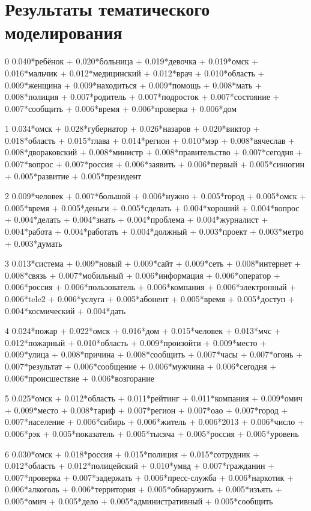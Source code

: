 \appendix
\chapter{Результаты тематического моделирования} \label{app:topics}
0 0.040*ребёнок + 0.020*больница + 0.019*девочка + 0.019*омск + 0.016*мальчик + 0.012*медицинский + 0.012*врач + 0.010*область + 0.009*женщина + 0.009*находиться + 0.009*помощь + 0.008*мать + 0.008*полиция + 0.007*родитель + 0.007*подросток + 0.007*состояние + 0.007*сообщить + 0.006*время + 0.006*проверка + 0.006*дом

1 0.034*омск + 0.028*губернатор + 0.026*назаров + 0.020*виктор + 0.018*область + 0.015*глава + 0.014*регион + 0.010*мэр + 0.008*вячеслав + 0.008*двораковский + 0.008*министр + 0.008*правительство + 0.007*сегодня + 0.007*вопрос + 0.007*россия + 0.006*заявить + 0.006*первый + 0.005*синюгин + 0.005*развитие + 0.005*президент

2 0.009*человек + 0.007*большой + 0.006*нужно + 0.005*город + 0.005*омск + 0.005*время + 0.005*деньги + 0.005*сделать + 0.004*хороший + 0.004*вопрос + 0.004*делать + 0.004*знать + 0.004*проблема + 0.004*журналист + 0.004*работа + 0.004*работать + 0.004*должный + 0.003*проект + 0.003*метро + 0.003*думать

3 0.013*система + 0.009*новый + 0.009*сайт + 0.009*сеть + 0.008*интернет + 0.008*связь + 0.007*мобильный + 0.006*информация + 0.006*оператор + 0.006*россия + 0.006*пользователь + 0.006*компания + 0.006*электронный + 0.006*tele2 + 0.006*услуга + 0.005*абонент + 0.005*время + 0.005*доступ + 0.004*космический + 0.004*дать

4 0.024*пожар + 0.022*омск + 0.016*дом + 0.015*человек + 0.013*мчс + 0.012*пожарный + 0.010*область + 0.009*произойти + 0.009*место + 0.009*улица + 0.008*причина + 0.008*сообщить + 0.007*часы + 0.007*огонь + 0.007*результат + 0.006*сообщение + 0.006*мужчина + 0.006*сегодня + 0.006*происшествие + 0.006*возгорание

5 0.025*омск + 0.012*область + 0.011*рейтинг + 0.011*компания + 0.009*омич + 0.009*место + 0.008*тариф + 0.007*регион + 0.007*оао + 0.007*город + 0.007*население + 0.006*сибирь + 0.006*житель + 0.006*2013 + 0.006*число + 0.006*рэк + 0.005*показатель + 0.005*тысяча + 0.005*россия + 0.005*уровень

6 0.030*омск + 0.018*россия + 0.015*полиция + 0.015*сотрудник + 0.012*область + 0.012*полицейский + 0.010*умвд + 0.007*гражданин + 0.007*проверка + 0.007*задержать + 0.006*пресс-служба + 0.006*наркотик + 0.006*алкоголь + 0.006*территория + 0.005*обнаружить + 0.005*изъять + 0.005*омич + 0.005*дело + 0.005*административный + 0.005*сообщить

